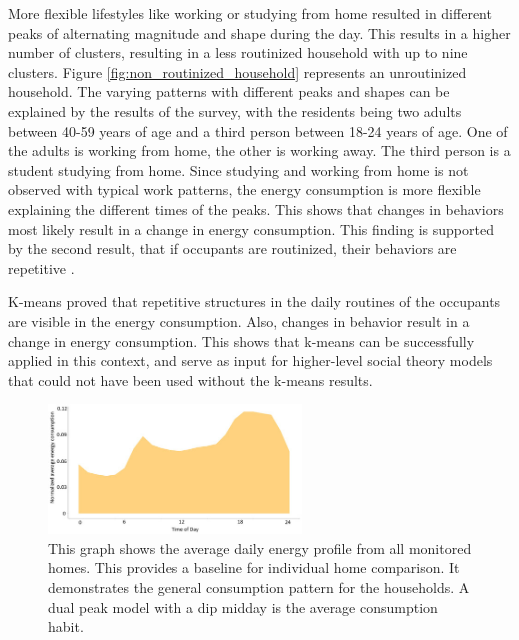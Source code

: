 More flexible lifestyles like working or studying from home resulted in different peaks of alternating magnitude and shape during the day.
This results in a higher number of clusters, resulting in a less routinized household with up to nine clusters.
Figure \ref{fig:non_routinized_household} represents an unroutinized household.
The varying patterns with different peaks and shapes can be explained by the results of the survey, with the residents being two adults between 40-59 years of age and a third person between 18-24 years of age.
One of the adults is working from home, the other is working away.
The third person is a student studying from home.
Since studying and working from home is not observed with typical work patterns, the energy consumption is more flexible explaining the different times of the peaks.
This shows that changes in behaviors most likely result in a change in energy consumption.
This finding is supported by the second result, that if occupants are routinized, their behaviors are repetitive \cite{BRE-EWP}.

K-means proved that repetitive structures in the daily routines of the occupants are visible in the energy consumption.
Also, changes in behavior result in a change in energy consumption.
This shows that k-means can be successfully applied in this context, and serve as input for higher-level social theory models that could not have been used without the k-means results.

\begin{figure}
    \centering
    \includegraphics[width=0.6\textwidth]{figures/malatesta_hsop/malatesta_totalDataAveraging.jpg}
    \caption{This graph shows the average daily energy profile from all monitored homes.
    This provides a baseline for individual home comparison.
    It demonstrates the general consumption pattern for the households.
    A dual peak model with a dip midday is the average consumption habit.
    }
    \label{fig:total_data_averaging}
\end{figure}

